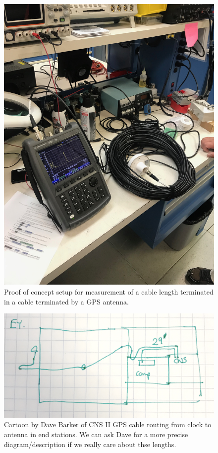 \documentclass{article}
\begin{document}
\begin{figure}[!htb]
	\begin{center}
		\includegraphics[width=0.8\linewidth]{img/time-domain-reflectrometer-dtf-test.jpg}
	\end{center}
	\caption{Proof of concept setup for measurement of a cable length terminated in a cable terminated by a GPS antenna.}
	\label{fig:tdr-test}
\end{figure}
\begin{figure}
	\begin{center}
		\includegraphics[width=0.8\linewidth]{img/endstation-antenna-cable.jpeg}
	\end{center}
	\caption{Cartoon by Dave Barker of CNS II GPS cable routing from clock to antenna in end stations. We can ask Dave for a more precise diagram/description if we really care about thse lengths.}
	\label{fig:routing}
\end{figure}
\end{document}
